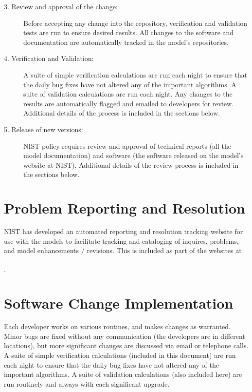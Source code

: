 \documentclass[11pt]{book}
\begin{document}
\begin{description}
\item [3. Review and approval of the change:] Before accepting any change into the repository, verification and validation tests are run to ensure desired results. All changes to the software and documentation are automatically tracked in the model's repositories.
\item [4. Verification and Validation:] A suite of simple verification calculations are run each night to ensure that the daily bug fixes have not altered any of the important algorithms. A suite of validation calculations are run each night. Any changes to the results are automatically flagged and emailed to developers for review. Additional details of the process is included in the sections below.
\item [5. Release of new versions:] NIST policy requires review and approval of technical reports (all the model documentation) and software (the software released on the model's website at NIST). Additional details of the review process is included in the sections below.
\end{description}

\section{Problem Reporting and Resolution}

NIST has developed an automated reporting and resolution tracking website for use with the models to facilitate tracking and cataloging of inquires, problems, and model enhancements / revisions. This is included as part of the websites at \newline
\href{https://github.com/firemodels/fds/issues}{} \\
\href{https://github.com/firemodels/smv/issues}{} \\
\href{https://github.com/firemodels/cfast/issues}{}.

\section{Software Change Implementation}

Each developer works on various routines, and makes changes as warranted. Minor bugs are fixed without any communication (the developers are in different locations), but more significant changes are discussed via email or telephone calls. A suite of simple verification calculations (included in this document) are run each night to ensure that the daily bug fixes have not altered any of the important algorithms. A suite of validation calculations (also included here) are run routinely and always with each significant upgrade.
\end{document}
